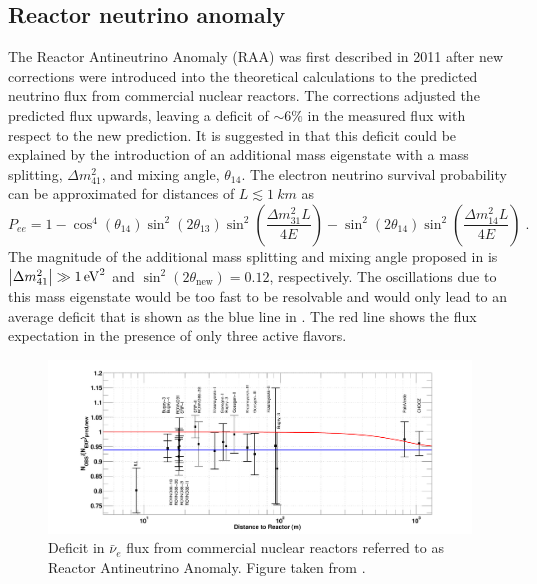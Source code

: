 \subsection{Reactor neutrino anomaly}
The Reactor Antineutrino Anomaly (RAA) was first described in 2011 after new corrections were introduced into the theoretical calculations to the predicted neutrino flux from commercial nuclear reactors. The corrections adjusted the predicted flux upwards, leaving a deficit of $\sim 6\%$ in the measured flux with respect to the new prediction. It is suggested in \cite{Mention:2011rk} that this deficit could be explained by the introduction of an additional mass eigenstate with a mass splitting, $\Delta m^2_{41}$, and mixing angle, $\theta_{14}$. The electron neutrino survival probability can be approximated for distances of $L\lesssim \SI{1}{km}$ as
\begin{equation}
    P_{ee} = 1 - \cos^4 (\theta_{14}) \sin^2 (2\theta_{13}) \sin^2 \left(\frac{\Delta m^2_{31} L}{4E} \right) - \sin^2 (2\theta_{14}) \sin^2 \left(\frac{\Delta m^2_{14} L}{4E} \right)\;.\label{eq:approx-Pee}
\end{equation}
The magnitude of the additional mass splitting and mixing angle proposed in \cite{Mention:2011rk} is $\abs{\Delta m^2_{41}} \gg \SI{1}{eV^2}$ and $\sin^2(2\theta_\mathrm{new})=0.12$, respectively. The oscillations due to this mass eigenstate would be too fast to be resolvable and would only lead to an average deficit that is shown as the blue line in . The red line shows the flux expectation in the presence of only three active flavors.
\begin{figure}
    \centering
    \includegraphics{figures/theory/raa.pdf}
    \caption{Deficit in $\bar{\nu}_e$ flux from commercial nuclear reactors referred to as Reactor Antineutrino Anomaly. Figure taken from \cite{Mention:2011rk}.\label{fig:raa}}
\end{figure}
